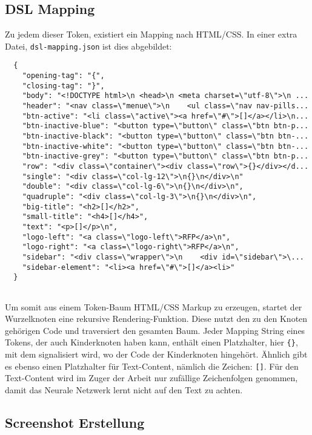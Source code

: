 \documentclass[pdftex,a4paper,halfparskip]{scrartcl}
\begin{document}
\subsection{DSL Mapping}

Zu jedem dieser Token, existiert ein Mapping nach HTML/CSS. In einer extra Datei, \texttt{dsl-mapping.json} ist dies abgebildet:

\begin{verbatim}
  {
    "opening-tag": "{",
    "closing-tag": "}",
    "body": "<!DOCTYPE html>\n <head>\n <meta charset=\"utf-8\">\n ...
    "header": "<nav class=\"menue\">\n    <ul class=\"nav nav-pills...
    "btn-active": "<li class=\"active\"><a href=\"#\">[]</a></li>\n...
    "btn-inactive-blue": "<button type=\"button\" class=\"btn btn-p...
    "btn-inactive-black": "<button type=\"button\" class=\"btn btn-...
    "btn-inactive-white": "<button type=\"button\" class=\"btn btn-...
    "btn-inactive-grey": "<button type=\"button\" class=\"btn btn-p...
    "row": "<div class=\"container\"><div class=\"row\">{}</div></d...
    "single": "<div class=\"col-lg-12\">\n{}\n</div>\n"
    "double": "<div class=\"col-lg-6\">\n{}\n</div>\n",
    "quadruple": "<div class=\"col-lg-3\">\n{}\n</div>\n",
    "big-title": "<h2>[]</h2>",
    "small-title": "<h4>[]</h4>",
    "text": "<p>[]</p>\n",
    "logo-left": "<a class=\"logo-left\">RFP</a>\n",
    "logo-right": "<a class=\"logo-right\">RFP</a>\n",
    "sidebar": "<div class=\"wrapper\">\n    <div id=\"sidebar\">\...
    "sidebar-element": "<li><a href=\"#\">[]</a><li>"  
  }
  
\end{verbatim}

Um somit aus einem Token-Baum HTML/CSS Markup zu erzeugen, startet der Wurzelknoten eine rekursive Rendering-Funktion. Diese nutzt den zu den Knoten gehörigen Code und traversiert den gesamten Baum. Jeder Mapping String eines Tokens, der auch Kinderknoten haben kann, enthält einen Platzhalter, hier \texttt{\{\}}, mit dem signalisiert wird, wo der Code der Kinderknoten hingehört. Ähnlich gibt es ebenso einen Platzhalter für Text-Content, nämlich die Zeichen: \texttt{[]}. 
Für den Text-Content wird im Zuger der Arbeit nur zufällige Zeichenfolgen genommen, damit das Neurale Netzwerk lernt nicht auf den Text zu achten. 


\subsection{Screenshot Erstellung}
\end{document}
